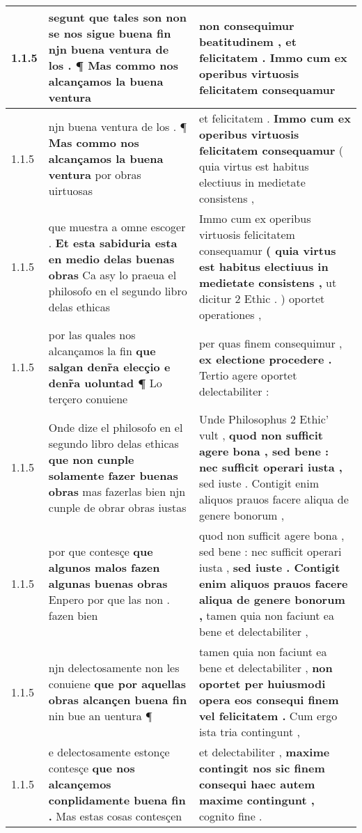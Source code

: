 \begin{tabular}{|p{1cm}|p{6.5cm}|p{6.5cm}|}
1.1.5 & segunt que tales son non se nos sigue buena fin \textbf{ njn buena ventura de los . ¶ } Mas commo nos alcançamos la buena ventura & non consequimur beatitudinem , \textbf{ et felicitatem . } Immo cum ex operibus virtuosis felicitatem consequamur \\\hline
1.1.5 & njn buena ventura de los . ¶ \textbf{ Mas commo nos alcançamos la buena ventura } por obras uirtuosas & et felicitatem . \textbf{ Immo cum ex operibus virtuosis felicitatem consequamur } ( quia virtus est habitus electiuus in medietate consistens , \\\hline
1.1.5 & que muestra a omne escoger . \textbf{ Et esta sabiduria esta en medio delas buenas obras } Ca asy lo praeua el philosofo en el segundo libro delas ethicas & Immo cum ex operibus virtuosis felicitatem consequamur \textbf{ ( quia virtus est habitus electiuus in medietate consistens , } ut dicitur 2 Ethic . ) oportet operationes , \\\hline
1.1.5 & por las quales nos alcançamos la fin \textbf{ que salgan denr̃a elecçio e denr̃a uoluntad ¶ } Lo terçero conuiene & per quas finem consequimur , \textbf{ ex electione procedere . } Tertio agere oportet delectabiliter : \\\hline
1.1.5 & Onde dize el philosofo en el segundo libro delas ethicas \textbf{ que non cunple solamente fazer buenas obras } mas fazerlas bien njn cunple de obrar obras iustas & Unde Philosophus 2 Ethic’ vult , \textbf{ quod non sufficit agere bona , sed bene : nec sufficit operari iusta , } sed iuste . Contigit enim aliquos prauos facere aliqua de genere bonorum , \\\hline
1.1.5 & por que contesçe \textbf{ que algunos malos fazen algunas buenas obras } Enpero por que las non . fazen bien & quod non sufficit agere bona , sed bene : nec sufficit operari iusta , \textbf{ sed iuste . Contigit enim aliquos prauos facere aliqua de genere bonorum , } tamen quia non faciunt ea bene et delectabiliter , \\\hline
1.1.5 & njn delectosamente non les conuiene \textbf{ que por aquellas obras alcançen buena fin } nin bue an uentura ¶ & tamen quia non faciunt ea bene et delectabiliter , \textbf{ non oportet per huiusmodi opera eos consequi finem vel felicitatem . } Cum ergo ista tria contingunt , \\\hline
1.1.5 & e delectosamente estonçe contesçe \textbf{ que nos alcançemos conplidamente buena fin . } Mas estas cosas contesçen & et delectabiliter , \textbf{ maxime contingit nos sic finem consequi haec autem maxime contingunt , } cognito fine . \\\hline

\end{tabular}
